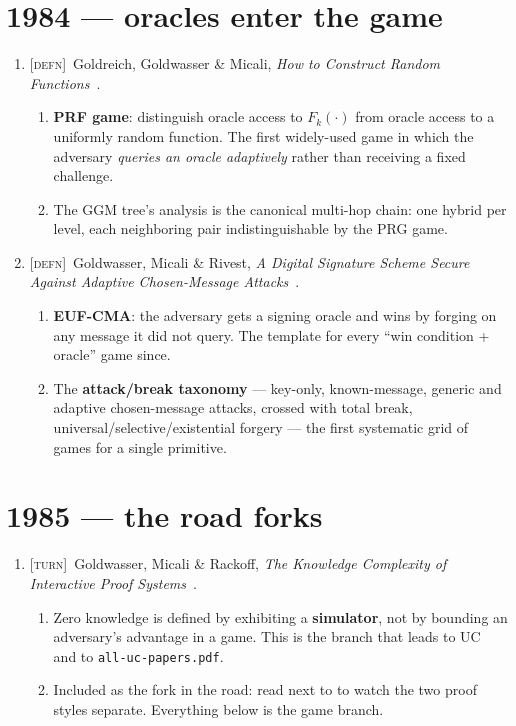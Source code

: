 \documentclass[11pt]{article}
\newcommand{\kind}[1]{{\footnotesize\textsc{\textcolor{yearcolor}{[#1]}}}\ }
\newcommand{\defn}{\kind{defn}}
\newcommand{\turn}{\kind{turn}}
\newcommand{\paper}[3]{#1, \emph{#2}~\cite{#3}.}
\begin{document}
\section{1984 --- oracles enter the game}

\begin{enumerate}
  \item \defn \paper{Goldreich, Goldwasser \& Micali}{How to Construct Random
    Functions}{GGM84}
    \begin{enumerate}
      \item \textbf{PRF game}: distinguish oracle access to $F_k(\cdot)$ from
        oracle access to a uniformly random function. The first widely-used
        game in which the adversary \emph{queries an oracle adaptively} rather
        than receiving a fixed challenge.
      \item The GGM tree's analysis is the canonical multi-hop chain: one hybrid
        per level, each neighboring pair indistinguishable by the PRG game.
    \end{enumerate}

  \item \defn \paper{Goldwasser, Micali \& Rivest}{A Digital Signature Scheme
    Secure Against Adaptive Chosen-Message Attacks}{GMR88}
    \begin{enumerate}
      \item \textbf{EUF-CMA}: the adversary gets a signing oracle and wins by
        forging on any message it did not query. The template for every
        ``win condition + oracle'' game since.
      \item The \textbf{attack/break taxonomy} --- key-only, known-message,
        generic and adaptive chosen-message attacks, crossed with total break,
        universal/selective/existential forgery --- the first systematic grid
        of games for a single primitive.
    \end{enumerate}
\end{enumerate}

\section{1985 --- the road forks}

\begin{enumerate}
  \item \turn \paper{Goldwasser, Micali \& Rackoff}{The Knowledge Complexity of
    Interactive Proof Systems}{GMR89}
    \begin{enumerate}
      \item Zero knowledge is defined by exhibiting a \textbf{simulator}, not by
        bounding an adversary's advantage in a game. This is the branch that
        leads to UC~\cite{Can01} and to \texttt{all-uc-papers.pdf}.
      \item Included as the fork in the road: read next to \cite{GM82} to watch
        the two proof styles separate. Everything below is the game branch.
    \end{enumerate}
\end{enumerate}
\end{document}

